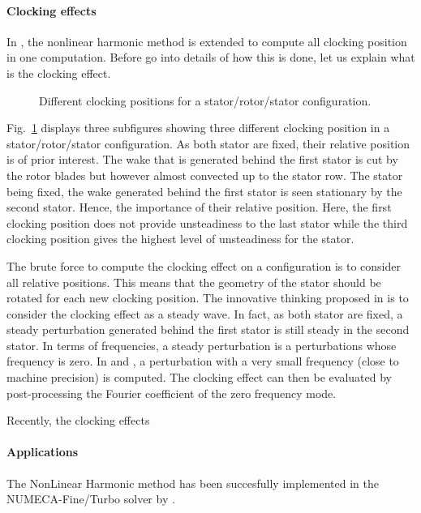 \paragraph{Clocking effects}
In \citet{He2002}, the nonlinear harmonic method is extended to
compute all clocking position in one computation. Before
go into details of how this is done, let us explain what is
the clocking effect.
\begin{figure}[htbp]
  \centering 
  \caption{Different clocking positions for a stator/rotor/stator
  configuration.}
  \label{fig:sm_nlh_clocking_effect}
\end{figure}
Fig.~\ref{fig:sm_nlh_clocking_effect} displays three subfigures showing three
different clocking position in a stator/rotor/stator configuration.
As both stator are fixed, their relative position is of 
prior interest. The wake that is generated behind the first stator
is cut by the rotor blades but however almost convected up to 
the stator row. The stator being fixed, the wake generated
behind the first stator is seen stationary by the second stator.
Hence, the importance of their relative position. Here, the
first clocking position does not provide unsteadiness to the
last stator while the third clocking position gives the highest
level of unsteadiness for the stator. 

The brute force to compute the clocking effect on a
configuration is to consider all relative positions. This means
that the geometry of the stator should be rotated for each new 
clocking position. The innovative thinking proposed in 
\citet{He2002} is to consider the clocking effect as a steady wave.
In fact, as both stator are fixed, a steady perturbation
generated behind the first stator is still steady in the second stator.
In terms of frequencies, a steady perturbation is a perturbations 
whose frequency is zero. In \citet{He2002} and \cite{Vilmin2009}, 
a perturbation with a very small frequency (close to machine precision)
is computed. The clocking effect can then be evaluated by
post-processing the Fourier coefficient of the zero frequency mode.

Recently, the clocking effects \citet{Vilmin2013a}

\paragraph{Applications}
The NonLinear Harmonic method 
has been succesfully implemented
in the NUMECA-Fine/Turbo solver by 
\citet{Vilmin2006, Vilmin2007, Vilmin2009, Vilmin2013a}.

